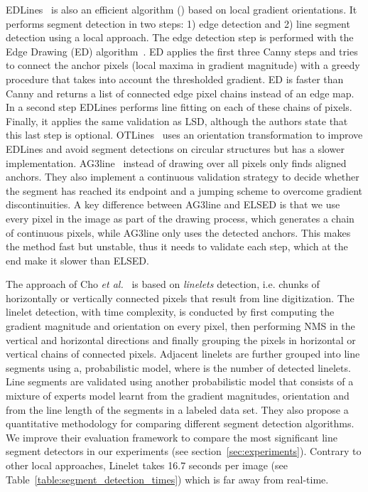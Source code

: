 \documentclass[preprint,12pt]{elsarticle}
\begin{document}
EDLines~\cite{akinlar2011edlines} is also an efficient  algorithm () based on local gradient orientations. It performs segment detection in two steps: 1) edge detection and 2) line segment detection using a local approach. The edge detection step is performed with the Edge Drawing (ED) algorithm~\cite{topal2012edge}. ED 
applies the first three Canny steps and tries to connect the anchor pixels (local maxima in gradient magnitude) with a greedy procedure that takes into account the thresholded gradient. ED is faster than Canny and returns a list of connected edge pixel chains instead of an edge map. In a second step EDLines performs line fitting on each of these chains of pixels. Finally, it applies the same validation as LSD, although the authors state that this last step is optional. 
OTLines~\cite{Ding2016OTLines} uses an orientation transformation to improve EDLines and avoid segment detections on circular structures but has a slower implementation. 
AG3line~\cite{zhang2021ag3line} instead of drawing over all pixels only finds aligned anchors. 
They also implement a continuous validation strategy to decide whether the segment has reached its endpoint and a jumping scheme to overcome gradient discontinuities. A key difference between AG3line and ELSED is that we use every pixel in the image as part of the drawing process, which generates a chain of continuous pixels, while AG3line only uses the detected anchors. This makes the method fast but unstable, thus it needs to validate each step, which at the end make it slower than ELSED. 

The approach of Cho \emph{et al.}~\cite{cho2017novel} is based on \emph{linelets} detection, i.e. chunks of horizontally or vertically connected pixels that result from line digitization. The linelet detection, with  time complexity, is conducted by first computing the gradient magnitude and orientation on every pixel, then performing NMS in the vertical and horizontal directions
and finally grouping the pixels in horizontal or vertical chains of connected pixels. Adjacent linelets are further grouped into line segments using a,  probabilistic model, where  is the number of detected linelets. Line segments are validated using another probabilistic model that consists of a mixture of experts model learnt from the gradient magnitudes, orientation and from the line length of the segments in a labeled data set. 
They also propose a quantitative methodology for comparing different segment detection algorithms. We improve their evaluation framework to compare the most significant line segment detectors in our experiments (see section~\ref{sec:experiments}).
Contrary to other local approaches, Linelet takes 16.7 seconds per image (see Table~\ref{table:segment_detection_times}) which is far away from real-time. 
\end{document}
